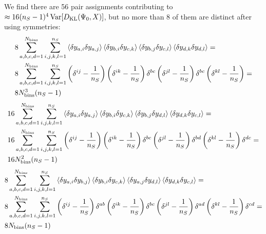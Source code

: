 We find there are 56 pair assignments contributing to $\approx 16(n_S-1)^4 \operatorname{Var} [D_{\rm KL} (\Psi_0, X)]$, but no more than 8 of them are distinct after using symmetries:
\begin{align}
& 8 \sum_{a,b,c,d=1}^{N_{\rm bins}} \sum_{i,j,k,l=1}^{n_S} \left\langle \delta y_{a,i} \delta y_{a,j} \right\rangle \left\langle \delta y_{b,i} \delta y_{c,k} \right\rangle \left\langle \delta y_{b,j} \delta y_{c,l} \right\rangle \left\langle \delta y_{d,k} \delta y_{d,l} \right\rangle = \nonumber \\
& 8 \sum_{a,b,c,d=1}^{N_{\rm bins}} \sum_{i,j,k,l=1}^{n_S} \left( \delta^{ij} - \frac1{n_S} \right) \left( \delta^{ik} - \frac1{n_S} \right) \delta^{bc} \left( \delta^{jl} - \frac1{n_S} \right) \delta^{bc} \left( \delta^{kl} - \frac1{n_S} \right)
= \nonumber \\
& 8 N_{\rm bins}^3 (n_S - 1)
\end{align}
\begin{align}
& 16 \sum_{a,b,c,d=1}^{N_{\rm bins}} \sum_{i,j,k,l=1}^{n_S} \left\langle \delta y_{a,i} \delta y_{a,j} \right\rangle \left\langle \delta y_{b,i} \delta y_{c,k} \right\rangle \left\langle \delta y_{b,j} \delta y_{d,l} \right\rangle \left\langle \delta y_{d,k} \delta y_{c,l} \right\rangle = \nonumber \\
& 16 \sum_{a,b,c,d=1}^{N_{\rm bins}} \sum_{i,j,k,l=1}^{n_S} \left( \delta^{ij} - \frac1{n_S} \right) \left( \delta^{ik} - \frac1{n_S} \right) \delta^{bc} \left( \delta^{jl} - \frac1{n_S} \right) \delta^{bd} \left( \delta^{kl} - \frac1{n_S} \right) \delta^{dc} = \nonumber \\
& 16 N_{\rm bins}^2 (n_S-1)
\end{align}
\begin{align}
& 8 \sum_{a,b,c,d=1}^{N_{\rm bins}} \sum_{i,j,k,l=1}^{n_S} \left\langle \delta y_{a,i} \delta y_{b,j}\right\rangle \left\langle \delta y_{b,i} \delta y_{c,k} \right\rangle \left\langle \delta y_{a,j} \delta y_{d,l} \right\rangle \left\langle \delta y_{d,k} \delta y_{c,l} \right\rangle = \nonumber \\
& 8 \sum_{a,b,c,d=1}^{N_{\rm bins}} \sum_{i,j,k,l=1}^{n_S} \left( \delta^{ij} - \frac1{n_S} \right) \delta^{ab} \left( \delta^{ik} - \frac1{n_S} \right) \delta^{bc} \left( \delta^{jl} - \frac1{n_S} \right) \delta^{ad} \left( \delta^{kl} - \frac1{n_S} \right) \delta^{cd} = \nonumber \\
& 8 N_{\rm bins} (n_S-1)
\end{align}

